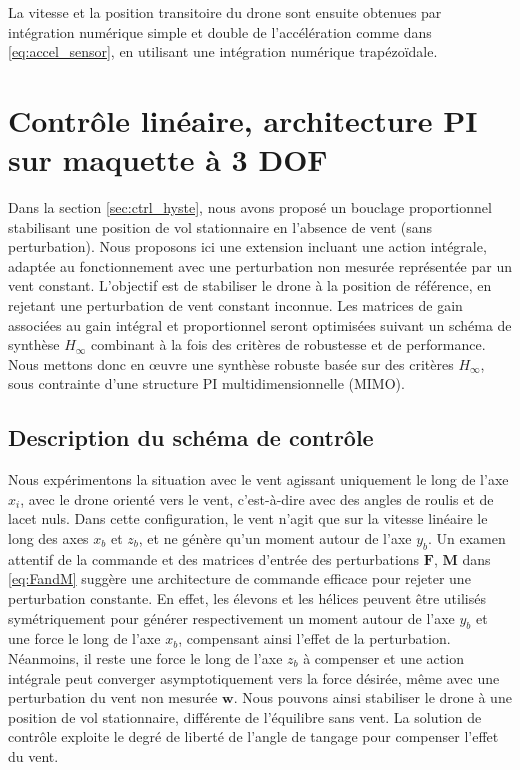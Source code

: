 La vitesse et la position transitoire du drone sont ensuite obtenues par intégration numérique simple et double de l'accélération comme dans \eqref{eq:accel_sensor}, en utilisant une intégration numérique trapézoïdale.

\section{Contrôle linéaire, architecture PI sur maquette à 3 DOF}
\label{sec:3dofcmd}
Dans la section \ref{sec:ctrl_hyste}, nous avons proposé un bouclage proportionnel stabilisant une position de vol stationnaire en l'absence de vent (sans perturbation). Nous proposons ici une extension incluant une action intégrale, adaptée au fonctionnement avec une perturbation non mesurée représentée par un vent constant. L'objectif est de stabiliser le drone à la position de référence, en rejetant une perturbation de vent constant inconnue.
Les matrices de gain associées au gain intégral et proportionnel seront optimisées suivant un schéma de synthèse $H_{\infty}$ combinant à la fois des critères de robustesse et de performance. Nous mettons donc en œuvre une synthèse robuste basée sur des critères $H_{\infty}$, sous contrainte d'une structure PI multidimensionnelle (MIMO).

\subsection{Description du schéma de contrôle}
Nous expérimentons la situation avec le vent agissant uniquement le long de l'axe $x_{i}$, avec le drone orienté vers le vent, c'est-à-dire avec des angles de roulis et de lacet nuls. Dans cette configuration, le vent n'agit que sur la vitesse linéaire le long des axes $x_{b}$ et $z_{b}$, et ne génère qu'un moment autour de l'axe $y_{b}$. Un examen attentif de la commande et des matrices d'entrée des perturbations $\boldsymbol{F}$, $\boldsymbol{M}$ dans \eqref{eq:FandM} suggère une architecture de commande efficace pour rejeter une perturbation constante. En effet, les élevons et les hélices peuvent être utilisés symétriquement pour générer respectivement un moment autour de l'axe $y_{b}$ et une force le long de l'axe $x_{b}$, compensant ainsi l'effet de la perturbation. Néanmoins, il reste une force le long de l'axe $z_{b}$ à compenser et une action intégrale peut converger asymptotiquement vers la force désirée, même avec une perturbation du vent non mesurée $\boldsymbol{w}$. Nous pouvons ainsi stabiliser le drone à une position de vol stationnaire, différente de l'équilibre sans vent. La solution de contrôle exploite le degré de liberté de l'angle de tangage pour compenser l'effet du vent.

